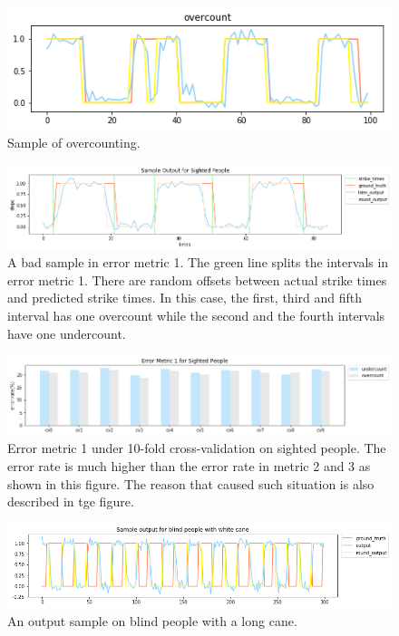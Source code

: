 \documentclass[11pt]{article}
\begin{document}
{\begin{figure}[ht]
\centering
\includegraphics[scale=0.4]{overcount}
\caption{Sample of overcounting.}
\label{fig:overcount}
\end{figure}


\begin{figure}[ht]
\centering
\includegraphics[scale=0.5]{output_small_metric2}
\caption{A bad sample in error metric 1. The green line splits the intervals in error metric 1. There are random offsets between actual strike times and predicted strike times. In this case, the first, third and fifth interval has one overcount while the second and the fourth intervals have one undercount.}
\label{fig:output_small_metric2}
\end{figure}




\begin{figure}[ht]
\centering
\includegraphics[scale=0.5]{error_metric_1_na_10fold}
\caption{Error metric 1 under 10-fold cross-validation on sighted people. The error rate is much higher than the error rate in metric 2 and 3 as shown in this figure. The reason that caused such situation is also described in tge figure.}
\label{fig:error_metric_1_na_10fold}
\end{figure}


\begin{figure}[ht]
\centering
\includegraphics[scale=0.5]{output_wc_1}
\caption{An output sample on blind people with a long cane.}
\label{fig:output_wc_1}
\end{figure}

}
\end{document}
